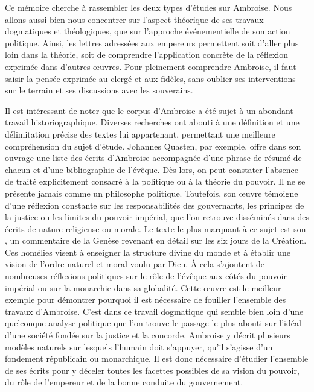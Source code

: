 \bigskip

Ce mémoire cherche à rassembler les deux types d'études sur Ambroise. Nous allons aussi bien nous concentrer sur l'aspect théorique de ses travaux dogmatiques et théologiques, que sur l'approche événementielle de son action politique. Ainsi, les lettres adressées aux empereurs permettent soit d'aller plus loin dans la théorie, soit de comprendre l'application concrète de la réflexion exprimée dans d'autres œuvres. Pour pleinement comprendre Ambroise, il faut saisir la pensée exprimée au clergé et aux fidèles, sans oublier ses interventions sur le terrain et ses discussions avec les souverains.

\bigskip

Il est intéressant de noter que le corpus d’Ambroise a été sujet à un abondant travail historiographique. Diverses recherches ont abouti à une définition et une délimitation précise des textes lui appartenant, permettant une meilleure compréhension du sujet d’étude. Johannes Quasten, par exemple, offre dans son ouvrage \autocite{quasten_initiation} une liste des écrits d’Ambroise accompagnée d’une phrase de résumé de chacun et d’une bibliographie de l’évêque. Dès lors, on peut constater l’absence de traité explicitement consacré à la politique ou à la théorie du pouvoir. Il ne se présente jamais comme un philosophe politique. Toutefois, son œuvre témoigne d’une réflexion constante sur les responsabilités des gouvernants, les principes de la justice ou les limites du pouvoir impérial, que l’on retrouve disséminés dans des écrits de nature religieuse ou morale. Le texte le plus marquant à ce sujet est son , un commentaire de la Genèse revenant en détail sur les six jours de la Création. Ces homélies visent à enseigner la structure divine du monde et à établir une vision de l’ordre naturel et moral voulu par Dieu. À cela s’ajoutent de nombreuses réflexions politiques sur le rôle de l’évêque aux côtés du pouvoir impérial ou sur la monarchie dans sa globalité\autocite[À partir du chapitre V, 21]{ambroise_csel_32_1}. Cette œuvre est le meilleur exemple pour démontrer pourquoi il est nécessaire de fouiller l'ensemble des travaux d'Ambroise. C'est dans ce travail dogmatique qui semble bien loin d'une quelconque analyse politique que l'on trouve le passage le plus abouti sur l'idéal d'une société fondée sur la justice et la concorde. Ambroise y décrit plusieurs modèles naturels sur lesquels l'humain doit s'appuyer, qu'il s'agisse d'un fondement républicain ou monarchique. Il est donc nécessaire d’étudier l’ensemble de ses écrits pour y déceler toutes les facettes possibles de sa vision du pouvoir, du rôle de l’empereur et de la bonne conduite du gouvernement.

